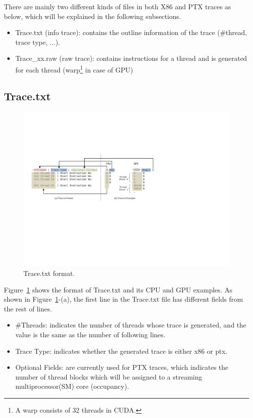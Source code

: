 There are mainly two different kinds of files in both X86 and PTX traces as
below, which will be explained in the following subsections.

\begin{itemize}\itemsep2pt
\item Trace.txt (info trace): contains the outline information of the trace (\#thread, trace type, ...).
\item Trace\_xx.raw (raw trace): contains instructions for a thread and is generated for each thread (warp\footnote{A warp consists of 32 threads in CUDA.} in case of GPU)
\end{itemize}



\subsection{Trace.txt}


\begin{figure}[htb]
\centering
\includegraphics{figs/trace_format}
\caption{Trace.txt format.}
\label{fig:trace_format}
\end{figure}

Figure~\ref{fig:trace_format} shows the format of Trace.txt and its CPU and GPU
examples.  As shown in Figure~\ref{fig:trace_format}-(a), the first line in the
Trace.txt file has different fields from the rest of lines.

\begin{itemize}\itemsep2pt
\item \#Threads: indicates the number of threads whose trace is generated, and the value 
is the same as the number of following lines. 
\item Trace Type: indicates whether the generated trace is either x86 or ptx.
\item Optional Fields: are currently used for PTX traces, which indicates the number of thread blocks
which will be assigned to a streaming multiprocessor(SM) core (occupancy).
\end{itemize}

